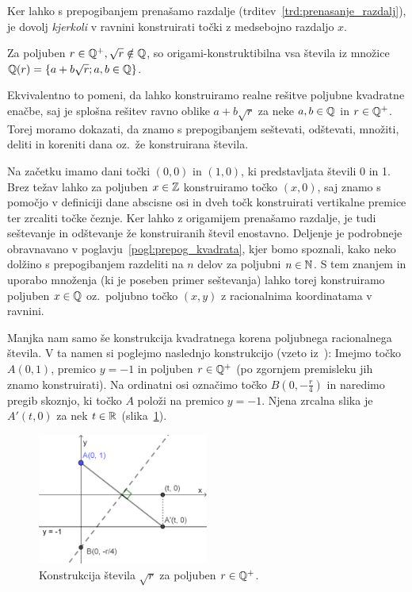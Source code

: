 \begin{opomba}
    Ker lahko s prepogibanjem prenašamo razdalje (trditev~\ref{trd:prenasanje_razdalj}), je dovolj \emph{kjerkoli} v ravnini konstruirati točki z medsebojno razdaljo $x$.
\end{opomba}

\begin{izrek}
    Za poljuben $r \in \mathbb Q^{+}, \sqrt{r} \notin \mathbb Q$, so origami-konstruktibilna vsa števila iz množice $\mathbb Q(r) = \{a + b\sqrt{r}; a, b \in \mathbb Q\}$.
\end{izrek}

\begin{dokaz}
    Ekvivalentno to pomeni, da lahko konstruiramo realne rešitve poljubne kvadratne enačbe, saj je splošna rešitev ravno oblike $a + b\sqrt{r} $ za neke $ a, b \in \mathbb Q$ in $r \in \mathbb Q^{+}$. Torej moramo dokazati, da znamo s prepogibanjem seštevati, odštevati, množiti, deliti in koreniti dana oz.\ že konstruirana števila.
    
    Na začetku imamo dani točki $(0, 0)$ in $(1, 0)$, ki predstavljata števili 0 in 1. Brez težav lahko za poljuben $x \in \mathbb Z$ konstruiramo točko $(x, 0)$, saj znamo s pomočjo v definiciji dane abscisne osi in dveh točk konstruirati vertikalne premice ter zrcaliti točke čeznje. Ker lahko z origamijem prenašamo razdalje, je tudi seštevanje in odštevanje že konstruiranih števil enostavno. Deljenje je podrobneje obravnavano v poglavju~\ref{pogl:prepog_kvadrata}, kjer bomo spoznali, kako neko dolžino s prepogibanjem razdeliti na $n$ delov za poljubni $n \in \mathbb N$. S tem znanjem in uporabo množenja (ki je poseben primer seštevanja) lahko torej konstruiramo poljuben $x \in \mathbb Q$ oz.\ poljubno točko $(x, y)$ z racionalnima koordinatama v ravnini.
    
    Manjka nam samo še konstrukcija kvadratnega korena poljubnega racionalnega števila. V ta namen si poglejmo naslednjo konstrukcijo (vzeto iz~\cite[str.\ 58]{hull2013}):
    Imejmo točko $A (0, 1) $, premico $y = -1$ in poljuben $r \in \mathbb Q^{+}$ (po zgornjem premisleku jih znamo konstruirati). Na ordinatni osi označimo točko $B (0, -\frac{r}{4})$ in naredimo pregib skoznjo, ki točko $A$ položi na premico $y = -1$. Njena zrcalna slika je $A' (t, 0) $ za nek $t \in \mathbb R$ (slika~\ref{fig:konstrukcija_korena}).
    
    \begin{figure}[h]
        \centering
        \includegraphics[width=0.5\textwidth]{images/kvadratni_koren.png}
        \caption[Konstrukcija korena]{Konstrukcija števila $\sqrt{r}$ za poljuben $r \in \mathbb Q^{+}$.}
        \label{fig:konstrukcija_korena}
    \end{figure}
    

\end{dokaz}
